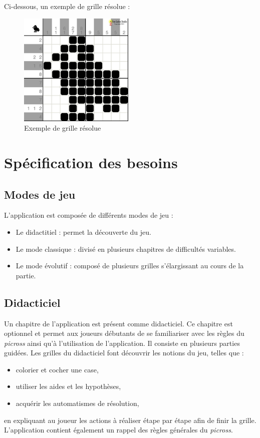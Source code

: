 \documentclass[a4paper, 12pt]{report}
\begin{document}
		Ci-dessous, un exemple de grille résolue :
		
	\begin{figure}[H]
		\centering
		\caption{Exemple de grille résolue}
		\includegraphics[width=5.5cm]{picross.png}
	\end{figure}
		
\chapter{Spécification des besoins}
\vspace*{0.5cm}

		\section{Modes de jeu}
		
			L'application est composée de différents modes de jeu :
			\begin{itemize}
            	\item Le didactitiel : permet la découverte du jeu.
            	\item Le mode classique : divisé en plusieurs chapitres de difficultés variables.
            	\item Le mode évolutif : composé de plusieurs grilles s'élargissant au cours de la partie.
        	\end{itemize}

	    \section{Didacticiel}
	    
		    Un chapitre de l'application est présent comme didacticiel. Ce chapitre est optionnel et permet aux joueurs   débutants de se familiariser avec les règles du \textit{picross} ainsi qu'à l'utilisation de l'application. Il consiste en plusieurs parties guidées. Les grilles du didacticiel font découvrir les notions du jeu, telles que :
		    \begin{itemize}
            	\item colorier et cocher une case,
            	\item utiliser les aides et les hypothèses,
            	\item acquérir les automatismes de résolution,
        	\end{itemize}
		    en expliquant au joueur les actions à réaliser étape par étape afin de finir la grille. L'application contient également un rappel des règles générales du \textit{picross}.
		    
\end{document}
